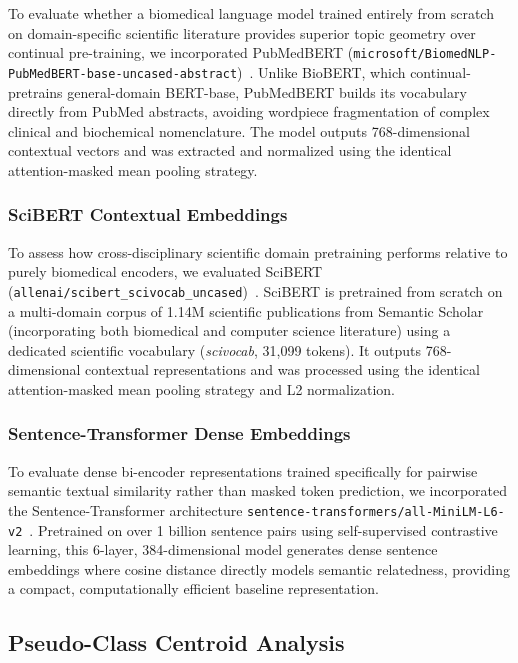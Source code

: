 \documentclass[a4paper,10pt,conference]{IEEEtran}
\begin{document}
To evaluate whether a biomedical language model trained entirely from scratch on domain-specific scientific literature provides superior topic geometry over continual pre-training, we incorporated PubMedBERT (\texttt{microsoft/BiomedNLP-PubMedBERT-base-uncased-abstract})~\cite{ref33}. Unlike BioBERT, which continual-pretrains general-domain BERT-base, PubMedBERT builds its vocabulary directly from PubMed abstracts, avoiding wordpiece fragmentation of complex clinical and biochemical nomenclature. The model outputs 768-dimensional contextual vectors and was extracted and normalized using the identical attention-masked mean pooling strategy.

\subsubsection{SciBERT Contextual Embeddings}

To assess how cross-disciplinary scientific domain pretraining performs relative to purely biomedical encoders, we evaluated SciBERT (\texttt{allenai/scibert\_scivocab\_uncased})~\cite{ref37}. SciBERT is pretrained from scratch on a multi-domain corpus of 1.14M scientific publications from Semantic Scholar (incorporating both biomedical and computer science literature) using a dedicated scientific vocabulary (\textit{scivocab}, 31{,}099 tokens). It outputs 768-dimensional contextual representations and was processed using the identical attention-masked mean pooling strategy and L2 normalization.

\subsubsection{Sentence-Transformer Dense Embeddings}

To evaluate dense bi-encoder representations trained specifically for pairwise semantic textual similarity rather than masked token prediction, we incorporated the Sentence-Transformer architecture \texttt{sentence-transformers/all-MiniLM-L6-v2}~\cite{ref38}. Pretrained on over 1 billion sentence pairs using self-supervised contrastive learning, this 6-layer, 384-dimensional model generates dense sentence embeddings where cosine distance directly models semantic relatedness, providing a compact, computationally efficient baseline representation.

\subsection{Pseudo-Class Centroid Analysis}
\end{document}
